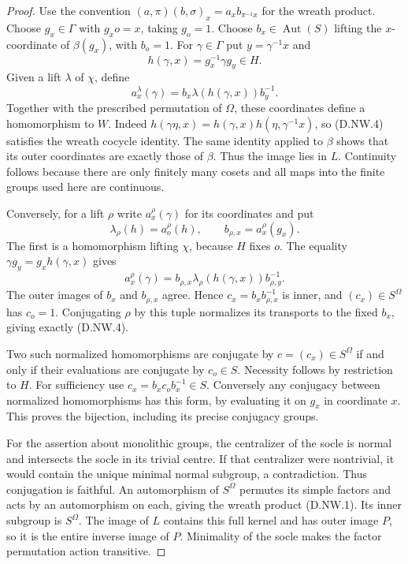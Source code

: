 \begin{proof}
Use the convention
$(a,\pi)(b,\sigma)_x=a_xb_{\pi^{-1}x}$ for the wreath
product. Choose $g_x\in\Gamma$ with $g_xo=x$, taking
$g_o=1$. Choose $b_x\in\operatorname{Aut}(S)$ lifting
the $x$-coordinate of $\beta(g_x)$, with $b_o=1$.
For $\gamma\in\Gamma$ put $y=\gamma^{-1}x$ and
\[
 h(\gamma,x)=g_x^{-1}\gamma g_y\in H.
                                                        \tag{D.NW.3}
\]
Given a lift $\lambda$ of $\chi$, define
\[
 a_x^\lambda(\gamma)
       =b_x\lambda(h(\gamma,x))b_y^{-1}.
                                                        \tag{D.NW.4}
\]
Together with the prescribed permutation of $\Omega$,
these coordinates define a homomorphism to $W$.
Indeed
$h(\gamma\eta,x)=h(\gamma,x)h(\eta,\gamma^{-1}x)$,
so (D.NW.4) satisfies the wreath cocycle identity.
The same identity applied to $\beta$ shows that its
outer coordinates are exactly those of $\beta$.
Thus the image lies in $L$. Continuity follows because
there are only finitely many cosets and all maps into
the finite groups used here are continuous.

Conversely, for a lift $\rho$ write $a_x^\rho(\gamma)$
for its coordinates and put
\[
 \lambda_\rho(h)=a_o^\rho(h),\qquad
                b_{\rho,x}=a_x^\rho(g_x).
                                                        \tag{D.NW.5}
\]
The first is a homomorphism lifting $\chi$, because
$H$ fixes $o$. The equality $\gamma g_y=g_xh(\gamma,x)$
gives
\[
 a_x^\rho(\gamma)=b_{\rho,x}
       \lambda_\rho(h(\gamma,x))b_{\rho,y}^{-1}.
                                                        \tag{D.NW.6}
\]
The outer images of $b_x$ and $b_{\rho,x}$ agree.
Hence $c_x=b_xb_{\rho,x}^{-1}$ is inner, and
$(c_x)\in S^\Omega$ has $c_o=1$. Conjugating $\rho$
by this tuple normalizes its transports to the fixed
$b_x$, giving exactly (D.NW.4).

Two such normalized homomorphisms are conjugate by
$c=(c_x)\in S^\Omega$ if and only if their evaluations
are conjugate by $c_o\in S$. Necessity follows by
restriction to $H$. For sufficiency use
$c_x=b_xc_ob_x^{-1}\in S$. Conversely any conjugacy
between normalized homomorphisms has this form, by
evaluating it on $g_x$ in coordinate $x$. This proves
the bijection, including its precise conjugacy groups.

For the assertion about monolithic groups, the
centralizer of the socle is normal and intersects the
socle in its trivial centre. If that centralizer were
nontrivial, it would contain the unique minimal normal
subgroup, a contradiction. Thus conjugation is faithful.
An automorphism of $S^\Omega$ permutes its simple
factors and acts by an automorphism on each, giving
the wreath product (D.NW.1). Its inner subgroup is
$S^\Omega$. The image of $L$ contains this full kernel
and has outer image $P$, so it is the entire inverse
image of $P$. Minimality of the socle makes the factor
permutation action transitive.


\end{proof}

